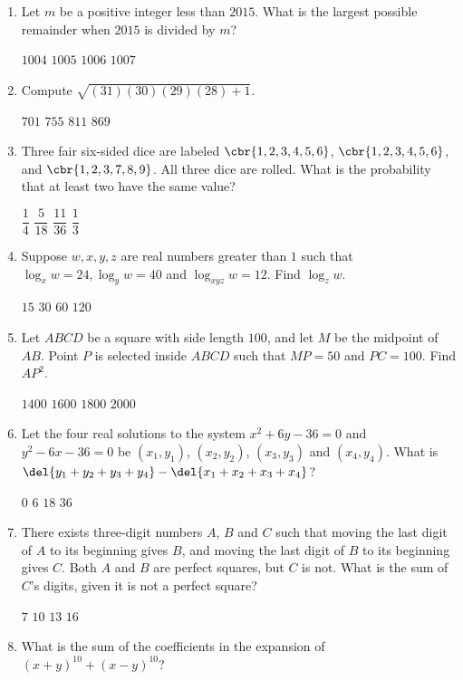\documentclass[11pt,paper=letter]{scrartcl}
\begin{document}
\begin{enumerate}
  \item Let $m$ be a positive integer less than $2015$. What is the largest possible remainder when $2015$ is divided by $m$?

  \fourch
  {$1004$}
  {$1005$}
  {$1006$}
  {$1007$}

  \item Compute $\sqrt{(31)(30)(29)(28) + 1}$.

  \fourch
  {$701$}
  {$755$}
  {$811$}
  {$869$}

  \item Three fair six-sided dice are labeled $\cbr{1,2,3,4,5,6}$, $\cbr{1,2,3,4,5,6}$, and $\cbr{1,2,3,7,8,9}$. All three dice are rolled. What is the probability that at least two have the same value?

  \fourch
  {$\dfrac14$}
  {$\dfrac5{18}$}
  {$\dfrac{11}{36}$}
  {$\dfrac13$}

  \item Suppose $w, x, y, z$ are real numbers greater than $1$ such that $\log_x w = 24, \log_y w = 40$ and $\log_{xyz} w = 12$. Find $\log_z w$.

  \fourch
  {$15$}
  {$30$}
  {$60$}
  {$120$}

  \item Let $ABCD$ be a square with side length $100$, and let $M$ be the midpoint of $AB$. Point $P$ is selected inside $ABCD$ such that $MP = 50$ and $PC = 100$. Find $AP^2$.

  \fourch
  {$1400$}
  {$1600$}
  {$1800$}
  {$2000$}

  \item Let the four real solutions to the system $x^2 + 6y - 36 = 0$ and $y^2 - 6x - 36 = 0$ be $(x_1, y_1)$, $(x_2, y_2)$, $(x_3, y_3)$ and $(x_4, y_4)$. What is $\del{y_1 + y_2 + y_3 + y_4} - \del{x_1 + x_2 + x_3 + x_4}$?

  \fourch
  {$0$}
  {$6$}
  {$18$}
  {$36$}

  \item There exists three-digit numbers $A$, $B$ and $C$ such that moving the last digit of $A$ to its beginning gives $B$, and moving the last digit of $B$ to its beginning gives $C$. Both $A$ and $B$ are perfect squares, but $C$ is not. What is the sum of $C$'s digits, given it is not a perfect square?

  \fourch
  {$7$}
  {$10$}
  {$13$}
  {$16$}

  \item What is the sum of the coefficients in the expansion of $(x+y)^{10} + (x-y)^{10}$?


\end{enumerate}
\end{document}
